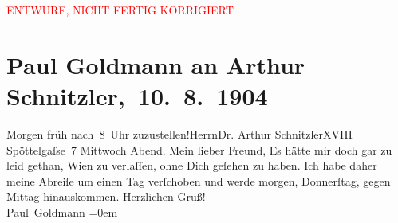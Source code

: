 
\begin{center}
            \textcolor{red}{ENTWURF, NICHT FERTIG KORRIGIERT}
                      \end{center}
            
         
         \renewcommand{\erwaehntePersonen}{Personen: Paul Goldmann}
         \renewcommand{\erwaehnteOrte}{Orte: Edmund-Weiß-Gasse 7, Wien}
         \renewcommand{\erwaehnteWerke}{}
               \section[ Paul Goldmann an Arthur Schnitzler, 10. 8. 1904]{ Paul Goldmann an Arthur Schnitzler, 10. 8. 1904}\nopagebreak{}\rehead{ }\begin{ledgroupsized}[t]{13cm}\normalsize\beginnumbering \toendnotes[C]{\smallbreak\pagebreak[2]} 
\toendnotes[C]{\smallbreak}\pstart{}{\pb}Morgen{ }früh nach 8 Uhr zuzustellen!\pend{}\pstart{}Herrn\pend{}\pstart{}Dr. Arthur Schnitzler\pend{}\pstart{}XVIII Spöttelgaſse 7\pend{}{\bigskip}\pstart
           {\pb}Mittwoch{ }Abend.\pend
           \pstart{}Mein lieber Freund,\pend\pstart
           Es hätte mir doch gar zu leid gethan, Wien zu
               verlaſſen, ohne Dich geſehen zu haben. Ich habe daher meine Abreiſe um einen Tag
               verſchoben und werde morgen, Donnerſtag, gegen
                  Mittag{ }\label{K_L03450-1v}\label{K_L03450-1h} hinauskommen.\pend
           \pstart
           Herzlichen Gruß! {\\[\baselineskip]}\spacefill\mbox{Paul Goldmann}\pend
           \leftskip=0em{}
         
         \endnumbering{}\end{ledgroupsized}  \newcommand{\dateiname}{L03450}\newcommand{\titel}{Paul Goldmann an Arthur Schnitzler, 10. 8. 1904}\newcommand{\editorInnen}{Martin Anton Müller und Laura Untner}
      